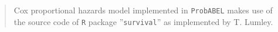 \documentclass[12pt]{article}
\begin{document}
\begin{quote}
Cox proportional hazards model implemented in \texttt{ProbABEL} 
makes use of the source code of \texttt{R} package ''\texttt{survival}'' 
as implemented by T. Lumley. 
\end{quote}






\printindex
\end{document}
